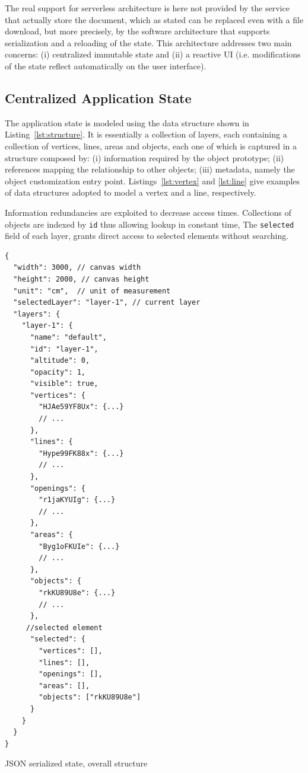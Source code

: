 The real support for serverless architecture is here not provided by the service that actually store the document, which as stated can be replaced even with a file download, but more precisely, by the software architecture that supports serialization and a reloading of the state. This architecture addresses two main concerns: (i) centralized immutable state and (ii) a reactive UI (i.e. modifications of the state reflect automatically on the user interface).

\subsection{Centralized Application State}\label{ssub:centr_state}

The application state is modeled using the data structure shown in Listing~\ref{lst:structure}. It is essentially a collection of layers, each containing a collection of vertices, lines, areas and objects, each one of which is captured in a structure composed by: (i) information required by the object prototype; (ii) references mapping the relationship to other objects; (iii) metadata, namely the object customization entry point. Listings~\ref{lst:vertex} and \ref{lst:line} give examples of data structures adopted to model a vertex and a line, respectively. 

Information redundancies are exploited to decrease access times. Collections of objects are indexed by \texttt{id} thus allowing lookup in constant time, The \texttt{selected} field of each layer, grants direct access to selected elements without searching.

\begin{listing}
\begin{verbatim}
{
  "width": 3000, // canvas width
  "height": 2000, // canvas height
  "unit": "cm",  // unit of measurement
  "selectedLayer": "layer-1", // current layer
  "layers": {
    "layer-1": {
      "name": "default",
      "id": "layer-1",
      "altitude": 0,
      "opacity": 1,
      "visible": true,
      "vertices": {
        "HJAe59YF8Ux": {...}
        // ...
      },
      "lines": {
        "Hype99FK88x": {...}
        // ...
      },
      "openings": {
        "r1jaKYUIg": {...}
        // ...
      },
      "areas": {
        "Byg1oFKUIe": {...}
        // ...
      },
      "objects": {
        "rkKU89U8e": {...}
        // ...
      },
     //selected element
      "selected": {
        "vertices": [],
        "lines": [],
        "openings": [],
        "areas": [],
        "objects": ["rkKU89U8e"]
      }
    }
  }
}
\end{verbatim}
\caption{JSON serialized state, overall structure} 
\label{lst:structure}
\end{listing}

